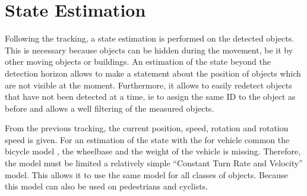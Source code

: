 \documentclass[11pt,oneside,openright]{mpreport}
\begin{document}
%     
%   


\section{State Estimation}
Following the tracking, a state estimation is performed on the detected objects. This is necessary because objects can be hidden during the movement,
be it by other moving objects or buildings. An estimation of the state beyond the detection horizon allows to make a statement about the position of 
objects which are not visible at the moment. Furthermore, it allows to easily redetect objects that have not been detected at a time, ie to assign the same ID to the object as before
and allows a well filtering of the measured objects.


From the previous tracking, the current position, speed, rotation and rotation speed is given. For an estimation of the state with the for vehicle common the bicycle model \cite{althoff2014online,snider2009automatic,kong2015kinematic}, 
the wheelbase and the weight of the vehicle is missing. Therefore, the model must be limited a relatively simple ``Constant Turn Rate and Velocity'' model.
This allows it to use the same model for all classes of objects. Because this model can also be used on pedestrians and cyclists.
\end{document}
